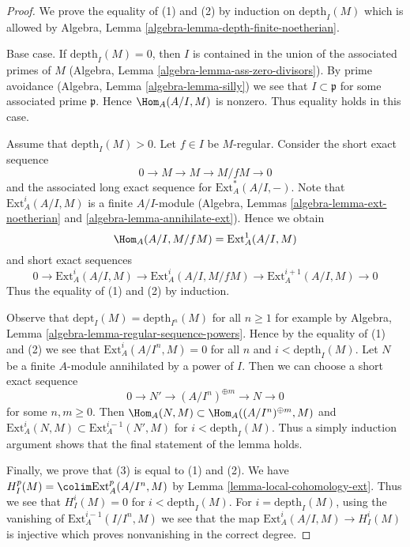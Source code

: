 \begin{proof}
We prove the equality of (1) and (2) by induction on $\text{depth}_I(M)$
which is allowed by
Algebra, Lemma \ref{algebra-lemma-depth-finite-noetherian}.

\medskip\noindent
Base case. If $\text{depth}_I(M) = 0$, then $I$ is contained in the union
of the associated primes of $M$
(Algebra, Lemma \ref{algebra-lemma-ass-zero-divisors}).
By prime avoidance (Algebra, Lemma \ref{algebra-lemma-silly})
we see that $I \subset \mathfrak p$ for some associated prime $\mathfrak p$.
Hence $\Hom_A(A/I, M)$
is nonzero. Thus equality holds in this case.

\medskip\noindent
Assume that $\text{depth}_I(M) > 0$. Let $f \in I$ be $M$-regular.
Consider the short exact sequence
$$
0 \to M \to M \to M/fM \to 0
$$
and the associated long exact sequence for $\text{Ext}^*_A(A/I, -)$.
Note that $\text{Ext}^i_A(A/I, M)$ is a finite $A/I$-module
(Algebra, Lemmas \ref{algebra-lemma-ext-noetherian} and
\ref{algebra-lemma-annihilate-ext}). Hence we obtain
$$
\Hom_A(A/I, M/fM) = \text{Ext}^1_A(A/I, M)
$$
and short exact sequences
$$
0 \to \text{Ext}^i_A(A/I, M) \to \text{Ext}^i_A(A/I, M/fM) \to
\text{Ext}^{i + 1}_A(A/I, M) \to 0
$$
Thus the equality of (1) and (2) by induction.

\medskip\noindent
Observe that $\text{dept}_I(M) = \text{depth}_{I^n}(M)$ for all $n \geq 1$
for example by Algebra, Lemma \ref{algebra-lemma-regular-sequence-powers}.
Hence by the equality of (1) and (2) we see that
$\text{Ext}^i_A(A/I^n, M) = 0$ for all $n$ and $i < \text{depth}_I(M)$.
Let $N$ be a finite $A$-module annihilated by a power of $I$.
Then we can choose a short exact sequence
$$
0 \to N' \to (A/I^n)^{\oplus m} \to N \to 0
$$
for some $n, m \geq 0$. Then
$\Hom_A(N, M) \subset \Hom_A((A/I^n)^{\oplus m}, M)$
and
$\text{Ext}^i_A(N, M) \subset \text{Ext}^{i - 1}_A(N', M)$
for $i < \text{depth}_I(M)$. Thus a simply induction argument
shows that the final statement of the lemma holds.

\medskip\noindent
Finally, we prove that (3) is equal to (1) and (2).
We have $H^p_I(M) = \colim \text{Ext}^p_A(A/I^n, M)$ by
Lemma \ref{lemma-local-cohomology-ext}.
Thus we see that $H^i_I(M) = 0$ for $i < \text{depth}_I(M)$.
For $i = \text{depth}_I(M)$, using the vanishing of
$\text{Ext}_A^{i - 1}(I/I^n, M)$ we see that the map
$\text{Ext}_A^i(A/I, M) \to H_I^i(M)$ is injective which
proves nonvanishing in the correct degree.
\end{proof}


